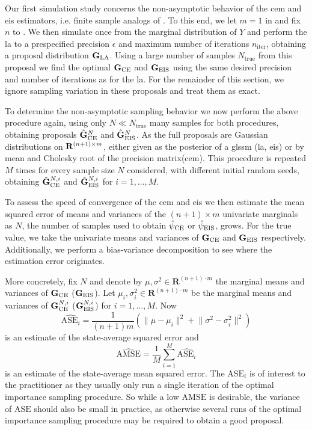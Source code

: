 
Our first simulation study concerns the non-asymptotic behavior of the \gls{cem} and \gls{eis} estimators, i.e. finite sample analogs of . To this end,
we let $m = 1$ in  and fix $n$ to . 
We then simulate once from the marginal distribution of $Y$ and perform the \gls{la} to a prespecified precision $\epsilon$ and maximum number of iterations $n_{\text{iter}}$, obtaining a proposal distribution $\mathbf G_{{\text{LA}}}$. Using a large number of samples $N_{\text{true}}$ from this proposal we find the optimal $\mathbf G_{{\text{CE}}}$ and $\mathbf G_{{\text{EIS}}}$ using the same desired precision and number of iterations as for the \gls{la}. For the remainder of this section, we ignore sampling variation in these proposals and treat them as exact. 

To determine the non-asymptotic sampling behavior we now perform the above procedure again, using only $N \ll N_{\text{true}}$ many samples for both procedures, obtaining proposals $\hat{\mathbf G}^{N}_{{\text{CE}}}$ and $\hat {\mathbf G}^{N}_{{\text{EIS}}}$. As the full proposals are Gaussian distributions on $\mathbf R^{(n+1)\times m}$, either given as the posterior of a \gls{glssm} (\gls{la}, \gls{eis}) or by mean and Cholesky root of the precision matrix(\gls{cem}). 
This procedure is repeated $M$ times for every sample size $N$ considered, with different initial random seeds, obtaining $\hat{\mathbf G}^{N,i}_{{\text{CE}}}$ and $\hat {\mathbf G}^{N,i}_{{\text{EIS}}}$ for $i = 1, \dots, M$.

To assess the speed of convergence of the \gls{cem} and \gls{eis} we then estimate the mean squared error of means and variances of the $(n+1) \times m$ univariate marginals as $N$, the number of samples used to obtain ${\hat\psi_{\text{CE}}}$ or ${\hat\psi_{\text{EIS}}}$, grows. For the true value, we take the univariate means and variances of $\mathbf G_{{\text{CE}}}$ and $\mathbf G_{{\text{EIS}}}$ respectively. Additionally, we perform a bias-variance decomposition to see where the estimation error originates. 

More concretely, fix $N$ and denote by $\mu, \sigma^{2} \in \mathbf R^{(n + 1) \cdot m}$ the marginal means and variances of $\mathbf G_{{\text{CE}}}$ ($\mathbf G_{{\text{EIS}}}$). 
Let $\mu_{i}, \sigma^{2}_{i}\in\mathbf R^{(n + 1) \cdot m}$ be the marginal means and variances of $\mathbf G^{N,i}_{{\text{CE}}}$ ($\mathbf G^{N,i}_{{\text{EIS}}}$) for $i = 1,\dots, M$. 
Now 
$$
\widehat{\text{ASE}_{i}} = \frac{1}{(n +1)m} \left( \lVert \mu - \mu_{i}\rVert^{2} + \lVert \sigma^{2} - \sigma^{2}_{i}\rVert^{2} \right)
$$
is an estimate of the state-average squared error and 
$$
\widehat{\text{AMSE}} = \frac{1}{M} \sum_{i = 1}^{M} \widehat{\text{ASE}_{i}}
$$
is an estimate of the state-average mean squared error. 
The $\text{ASE}_{i}$ is of interest to the practitioner as they usually only run a single iteration of the optimal importance sampling procedure. So while a low $\text{AMSE}$ is desirable, the variance of $\text{ASE}$ should also be small in practice, as otherwise several runs of the optimal importance sampling procedure may be required to obtain a good proposal.

